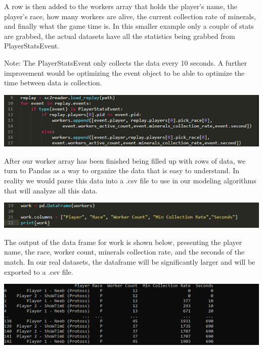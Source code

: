 \documentclass[a4paper,12pt]{report}
\begin{document}
A row is then added to the workers array that holds the player’s name, the player’s race, how many workers are alive, the current collection rate of minerals, and finally what the game time is. In this smaller example only a couple of stats are grabbed, the actual datasets have all the statistics being grabbed from PlayerStatsEvent.

Note: The PlayerStatsEvent only collects the data every 10 seconds. A further improvement would be optimizing the event object to be able to optimize the time between data is collection.

\begin{center}
    \captionsetup{type=figure}
    \includegraphics[width=.9\linewidth]{media/PlayerStatsEvents.png}
\end{center}

After our worker array has been finished being filled up with rows of data, we turn to Pandas as a way to organize the data that is easy to understand. In reality we would parse this data into a .csv file to use in our modeling algorithms that will analyze all this data.

\begin{center}
    \captionsetup{type=figure}
    \includegraphics[width=.9\linewidth]{media/PandasTable.png}
\end{center}

The output of the data frame for work is shown below, presenting the player name, the race, worker count, minerals collection rate, and the seconds of the match. In our real datasets, the dataframe will be significantly larger and will be exported to a .csv file. 

\begin{center}
    \captionsetup{type=figure}
    \includegraphics[width=.9\linewidth]{media/CSVPSE.png}
\end{center}
\end{document}
